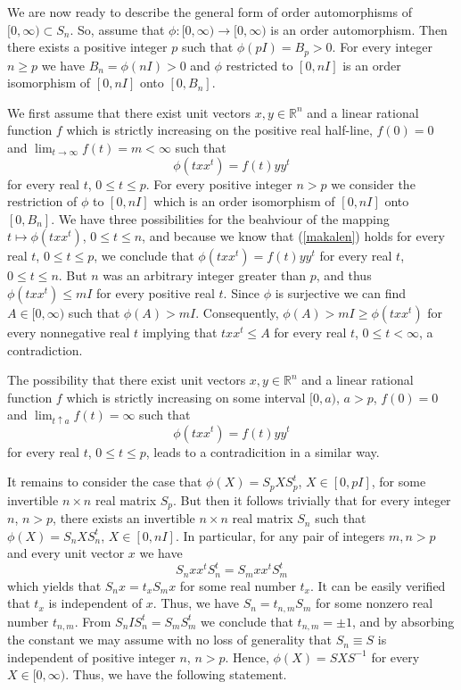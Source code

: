 \documentclass{article}
\begin{document}
We are now ready to describe the general form of order automorphisms of $[0, \infty) \subset S_n$. So, assume that $\phi : [0, \infty) \to [0, \infty)$ is an order automorphism. Then there exists a positive integer $p$ such that $\phi (pI) = B_p >0$. For every integer $n \ge p$ we have $B_n = \phi (nI)  > 0$ and $\phi$ restricted to $[0, nI]$ is an order isomorphism of $[0, nI]$ onto $[0, B_n]$. 

We first assume that there exist unit vectors $x,y \in \mathbb{R}^n$ and a linear rational function $f$ which is strictly increasing on the positive real half-line, $f(0)= 0$ and $\lim_{t \to \infty} f(t) = m < \infty$ such that
\begin{equation}\label{makalen}
\phi (t xx^t) = f(t) yy^t
\end{equation}
for every real $t$, $0 \le t \le p$. For every positive integer $n > p$ we consider the restriction of $\phi$ to $[0, nI]$ which is an order isomorphism of $[0, nI]$ onto $[0, B_n]$. We have three possibilities for the beahviour of the mapping $t \mapsto \phi (txx^t)$, $0 \le t \le n$, and because we know that (\ref{makalen}) holds for every real $t$, $0 \le t \le p$, we conclude that 
$\phi (t xx^t) = f(t) yy^t$
for every real $t$, $0 \le t \le n$. But $n$ was an arbitrary integer greater than $p$, and thus $\phi (t xx^t) \le mI$ for every positive real $t$. Since $\phi$ is surjective we can find $A \in [0, \infty)$ such that $\phi (A) > mI$. Consequently, $\phi (A) > mI \ge \phi (t xx^t)$ for every nonnegative real $t$ implying that $txx^t \le A$ for every real $t$, $ 0 \le t < \infty$, a contradiction.

The possibility that there exist unit vectors $x,y \in \mathbb{R}^n$ and a linear rational function $f$ which is strictly increasing on some interval $[0, a)$, $a > p$, $f(0)= 0$  and $\lim_{t \uparrow a} f(t) = \infty$ such that
$$
\phi (t xx^t) = f(t) yy^t
$$
for every real $t$, $0 \le t \le p$, leads to a contradicition in a similar way.

It remains to consider the case that $\phi (X) = S_p XS_{p}^t$, $X \in [0, pI]$, for some invertible $n \times n$ real matrix $S_p$. But then it follows trivially that for every integer $n$, $n >p$, there exists an  invertible $n \times n$ real matrix $S_n$ such that $\phi (X) = S_n XS_{n}^t$, $X \in [0, nI]$. In particular, for any pair of integers $m,n >p$ and every unit vector $x$ we have 
$$
S_n xx^t S_{n}^t = S_m xx^t S_{m}^t
$$
which yields that $S_n x = t_x S_m x$ for some real number $t_x$. It can be easily verified that $t_x$ is independent of $x$. Thus, we have $S_n = t_{n,m} S_m$ for some nonzero real number $t_{n,m}$. From $S_n I S_{n}^t = S_m S_{m}^t$ we conclude that $ t_{n,m} = \pm 1$, and  by absorbing the constant we may assume with no loss of generality that $S_n \equiv S$ is independent of positive integer $n$, $n > p$. Hence, $\phi (X) = SXS^{-1}$ for every $X \in [0, \infty)$. Thus, we have the following statement.
\end{document}
